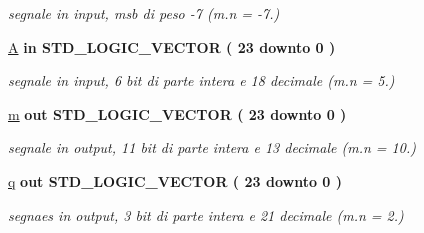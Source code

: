 \begin{DoxyCompactItemize}
\begin{DoxyCompactList}\small\item\em segnale in input, msb di peso -\/7 (m.\+n = -\/7.) \end{DoxyCompactList}\item 
\hyperlink{group___linear_regression_gae1ad6503d157f6c26abdce1131d31ec2}{A}  {\bfseries {\bfseries \textcolor{vhdlchar}{in}\textcolor{vhdlchar}{ }}} {\bfseries \textcolor{vhdlchar}{S\+T\+D\+\_\+\+L\+O\+G\+I\+C\+\_\+\+V\+E\+C\+T\+OR}\textcolor{vhdlchar}{ }\textcolor{vhdlchar}{(}\textcolor{vhdlchar}{ }\textcolor{vhdlchar}{ } \textcolor{vhdldigit}{23} \textcolor{vhdlchar}{ }\textcolor{vhdlchar}{downto}\textcolor{vhdlchar}{ }\textcolor{vhdlchar}{ } \textcolor{vhdldigit}{0} \textcolor{vhdlchar}{ }\textcolor{vhdlchar}{)}\textcolor{vhdlchar}{ }} 
\begin{DoxyCompactList}\small\item\em segnale in input, 6 bit di parte intera e 18 decimale (m.\+n = 5.) \end{DoxyCompactList}\item 
\hyperlink{group___linear_regression_gad943f01112876248a4734aa3c3d2e3f2}{m}  {\bfseries {\bfseries \textcolor{vhdlchar}{out}\textcolor{vhdlchar}{ }}} {\bfseries \textcolor{vhdlchar}{S\+T\+D\+\_\+\+L\+O\+G\+I\+C\+\_\+\+V\+E\+C\+T\+OR}\textcolor{vhdlchar}{ }\textcolor{vhdlchar}{(}\textcolor{vhdlchar}{ }\textcolor{vhdlchar}{ } \textcolor{vhdldigit}{23} \textcolor{vhdlchar}{ }\textcolor{vhdlchar}{downto}\textcolor{vhdlchar}{ }\textcolor{vhdlchar}{ } \textcolor{vhdldigit}{0} \textcolor{vhdlchar}{ }\textcolor{vhdlchar}{)}\textcolor{vhdlchar}{ }} 
\begin{DoxyCompactList}\small\item\em segnale in output, 11 bit di parte intera e 13 decimale (m.\+n = 10.) \end{DoxyCompactList}\item 
\hyperlink{group___linear_regression_gacec4f4b6d139d1ada088ca2d3d881418}{q}  {\bfseries {\bfseries \textcolor{vhdlchar}{out}\textcolor{vhdlchar}{ }}} {\bfseries \textcolor{vhdlchar}{S\+T\+D\+\_\+\+L\+O\+G\+I\+C\+\_\+\+V\+E\+C\+T\+OR}\textcolor{vhdlchar}{ }\textcolor{vhdlchar}{(}\textcolor{vhdlchar}{ }\textcolor{vhdlchar}{ } \textcolor{vhdldigit}{23} \textcolor{vhdlchar}{ }\textcolor{vhdlchar}{downto}\textcolor{vhdlchar}{ }\textcolor{vhdlchar}{ } \textcolor{vhdldigit}{0} \textcolor{vhdlchar}{ }\textcolor{vhdlchar}{)}\textcolor{vhdlchar}{ }} 
\begin{DoxyCompactList}\small\item\em segnaes in output, 3 bit di parte intera e 21 decimale (m.\+n = 2.) \end{DoxyCompactList}\end{DoxyCompactItemize}
